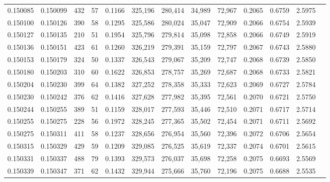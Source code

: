 \begin{tabular}{rrrrrrrrrrrrr}
0.150085 & 0.150099 &   432 &  57 &                                     0.1166 & 325,196 & 280,414 &  34,989 &  72,967 & 0.2065 & 0.6759 & 2.5975 \\
0.150100 & 0.150126 &   390 &  58 &                                     0.1295 & 325,586 & 280,024 &  35,047 &  72,909 & 0.2066 & 0.6754 & 2.5939 \\
0.150127 & 0.150135 &   210 &  51 &                                     0.1954 & 325,796 & 279,814 &  35,098 &  72,858 & 0.2066 & 0.6749 & 2.5919 \\
0.150136 & 0.150151 &   423 &  61 &                                     0.1260 & 326,219 & 279,391 &  35,159 &  72,797 & 0.2067 & 0.6743 & 2.5880 \\
0.150153 & 0.150179 &   324 &  50 &                                     0.1337 & 326,543 & 279,067 &  35,209 &  72,747 & 0.2068 & 0.6739 & 2.5850 \\
0.150180 & 0.150203 &   310 &  60 &                                     0.1622 & 326,853 & 278,757 &  35,269 &  72,687 & 0.2068 & 0.6733 & 2.5821 \\
0.150204 & 0.150230 &   399 &  64 &                                     0.1382 & 327,252 & 278,358 &  35,333 &  72,623 & 0.2069 & 0.6727 & 2.5784 \\
0.150230 & 0.150242 &   376 &  62 &                                     0.1416 & 327,628 & 277,982 &  35,395 &  72,561 & 0.2070 & 0.6721 & 2.5750 \\
0.150244 & 0.150255 &   389 &  51 &                                     0.1159 & 328,017 & 277,593 &  35,446 &  72,510 & 0.2071 & 0.6717 & 2.5714 \\
0.150255 & 0.150275 &   228 &  56 &                                     0.1972 & 328,245 & 277,365 &  35,502 &  72,454 & 0.2071 & 0.6711 & 2.5692 \\
0.150275 & 0.150311 &   411 &  58 &                                     0.1237 & 328,656 & 276,954 &  35,560 &  72,396 & 0.2072 & 0.6706 & 2.5654 \\
0.150315 & 0.150329 &   429 &  59 &                                     0.1209 & 329,085 & 276,525 &  35,619 &  72,337 & 0.2074 & 0.6701 & 2.5615 \\
0.150331 & 0.150337 &   488 &  79 &                                     0.1393 & 329,573 & 276,037 &  35,698 &  72,258 & 0.2075 & 0.6693 & 2.5569 \\
0.150339 & 0.150347 &   371 &  62 &                                     0.1432 & 329,944 & 275,666 &  35,760 &  72,196 & 0.2075 & 0.6688 & 2.5535 \\

\end{tabular}
